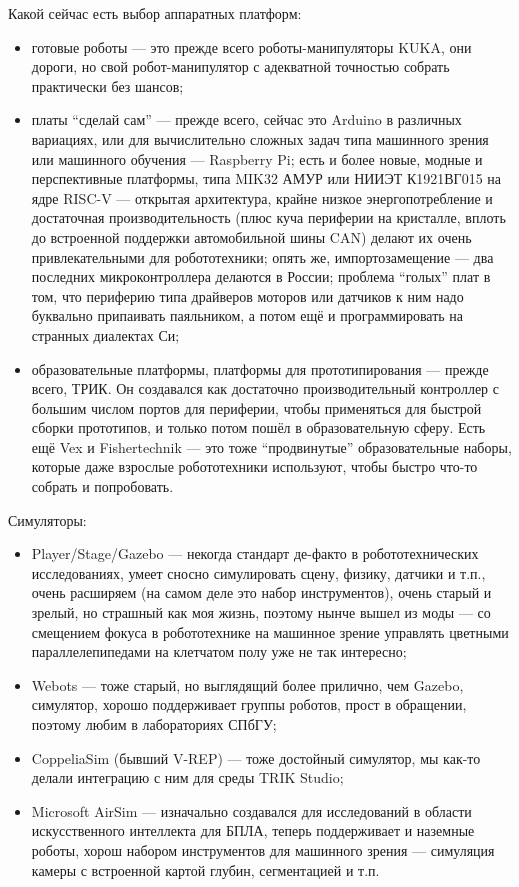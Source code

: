 \documentclass{../../text-style}
\begin{document}
Какой сейчас есть выбор аппаратных платформ:

\begin{itemize}
    \item готовые роботы --- это прежде всего роботы-манипуляторы KUKA, они дороги, но свой робот-манипулятор с адекватной точностью собрать практически без шансов;
    \item платы \enquote{сделай сам} --- прежде всего, сейчас это Arduino в различных вариациях, или для вычислительно сложных задач типа машинного зрения или машинного обучения --- Raspberry Pi; 
        есть и более новые, модные и перспективные платформы, типа MIK32 АМУР или НИИЭТ К1921ВГ015 на ядре RISC-V --- открытая архитектура, крайне низкое энергопотребление и достаточная производительность (плюс куча периферии на кристалле, вплоть до встроенной поддержки автомобильной шины CAN) делают их очень привлекательными для робототехники; опять же, импортозамещение --- два последних микроконтроллера делаются в России;
        проблема \enquote{голых} плат в том, что периферию типа драйверов моторов или датчиков к ним надо буквально припаивать паяльником, а потом ещё и программировать на странных диалектах Си;
    \item образовательные платформы, платформы для прототипирования --- прежде всего, ТРИК. Он создавался как достаточно производительный контроллер с большим числом портов для периферии, чтобы применяться для быстрой сборки прототипов, и только потом пошёл в образовательную сферу. Есть ещё Vex и Fishertechnik --- это тоже \enquote{продвинутые} образовательные наборы, которые даже взрослые робототехники используют, чтобы быстро что-то собрать и попробовать.
\end{itemize}

Симуляторы:

\begin{itemize}
    \item Player/Stage/Gazebo --- некогда стандарт де-факто в робототехнических исследованиях, умеет сносно симулировать сцену, физику, датчики и т.п., очень расширяем (на самом деле это набор инструментов), очень старый и зрелый, но страшный как моя жизнь, поэтому нынче вышел из моды --- со смещением фокуса в робототехнике на машинное зрение управлять цветными параллелепипедами на клетчатом полу уже не так интересно;
    \item Webots --- тоже старый, но выглядящий более прилично, чем Gazebo, симулятор, хорошо поддерживает группы роботов, прост в обращении, поэтому любим в лабораториях СПбГУ;
    \item CoppeliaSim (бывший V-REP) --- тоже достойный симулятор, мы как-то делали интеграцию с ним для среды TRIK Studio;
    \item Microsoft AirSim --- изначально создавался для исследований в области искусственного интеллекта для БПЛА, теперь поддерживает и наземные роботы, хорош набором инструментов для машинного зрения --- симуляция камеры с встроенной картой глубин, сегментацией и т.п.
\end{itemize}
\end{document}
